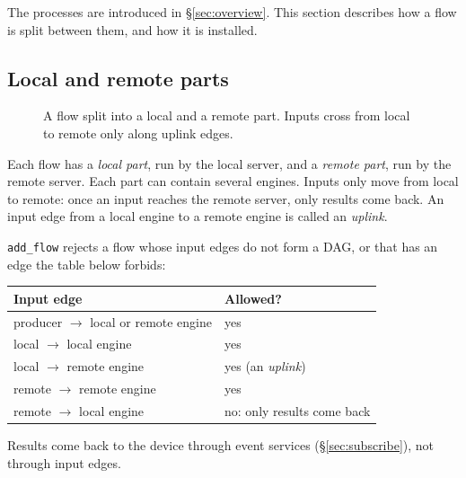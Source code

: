 \documentclass[11pt]{article}
\newcommand{\code}[1]{\texttt{#1}}
\begin{document}
The processes are introduced in \S\ref{sec:overview}. This section describes
how a flow is split between them, and how it is installed.

\subsection{Local and remote parts}

\begin{figure}[h]
\centering
{}
\caption{A flow split into a local and a remote part. Inputs cross from local
to remote only along uplink edges.}
\label{fig:parts}
\end{figure}

Each flow has a \emph{local part}, run by the local server, and a
\emph{remote part}, run by the remote server. Each part can contain several
engines. Inputs only move from local to remote: once an input reaches the
remote server, only results come back. An input edge from a local engine to a
remote engine is called an \emph{uplink}.

\code{add\_flow} rejects a flow whose input edges do not form a DAG, or that
has an edge the table below forbids:

\begin{center}
\small
\begin{tabular}{@{}ll@{}}
\toprule
Input edge & Allowed? \\
\midrule
producer $\to$ local or remote engine & yes \\
local $\to$ local engine   & yes \\
local $\to$ remote engine  & yes (an \emph{uplink}) \\
remote $\to$ remote engine & yes \\
remote $\to$ local engine  & no: only results come back \\
\bottomrule
\end{tabular}
\end{center}
Results come back to the device through event services (\S\ref{sec:subscribe}),
not through input edges.
\end{document}
